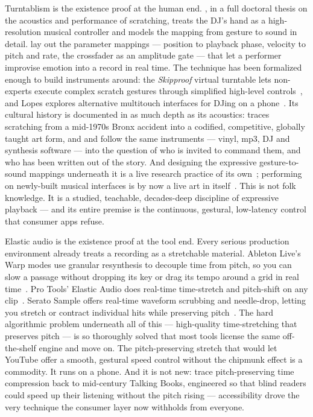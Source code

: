 \documentclass[10pt,letterpaper,twocolumn]{article}
\begin{document}
Turntablism is the existence proof at the human end. \citet{hansen2010scratching}, in a full doctoral thesis on the acoustics and performance of scratching, treats the DJ's hand as a high-resolution musical controller and models the mapping from gesture to sound in detail. \citet{hansen2006mapping} lay out the parameter mappings --- position to playback phase, velocity to pitch and rate, the crossfader as an amplitude gate --- that let a performer improvise emotion into a record in real time. The technique has been formalized enough to build instruments around: the \emph{Skipproof} virtual turntable lets non-experts execute complex scratch gestures through simplified high-level controls~\citep{hansen2010skipproof}, and Lopes explores alternative multitouch interfaces for DJing on a phone~\citep{lopes2010mtdjing}. Its cultural history is documented in as much depth as its acoustics: \citet{katz2012groove} traces scratching from a mid-1970s Bronx accident into a codified, competitive, globally taught art form, and \citet{farrugia2012beyond} and \citet{rodgers2010pink} follow the same instruments --- vinyl, mp3, DJ and synthesis software --- into the question of who is invited to command them, and who has been written out of the story. And designing the expressive gesture-to-sound mappings underneath it is a live research practice of its own~\citep{fiebrink2009meta}; performing on newly-built musical interfaces is by now a live art in itself~\citep{knotts2015algorithmic}. This is not folk knowledge. It is a studied, teachable, decades-deep discipline of expressive playback --- and its entire premise is the continuous, gestural, low-latency control that consumer apps refuse.

Elastic audio is the existence proof at the tool end. Every serious production environment already treats a recording as a stretchable material. Ableton Live's Warp modes use granular resynthesis to decouple time from pitch, so you can slow a passage without dropping its key or drag its tempo around a grid in real time~\citep{ableton2024warp}. Pro Tools' Elastic Audio does real-time time-stretch and pitch-shift on any clip~\citep{avid2024elastic}. Serato Sample offers real-time waveform scrubbing and needle-drop, letting you stretch or contract individual hits while preserving pitch~\citep{serato2017sample}. The hard algorithmic problem underneath all of this --- high-quality time-stretching that preserves pitch --- is so thoroughly solved that most tools license the same off-the-shelf engine and move on. The pitch-preserving stretch that would let YouTube offer a smooth, gestural speed control without the chipmunk effect is a commodity. It runs on a phone. And it is not new: \citet{mills2020aural} trace pitch-preserving time compression back to mid-century Talking Books, engineered so that blind readers could speed up their listening without the pitch rising --- accessibility drove the very technique the consumer layer now withholds from everyone.
\end{document}
